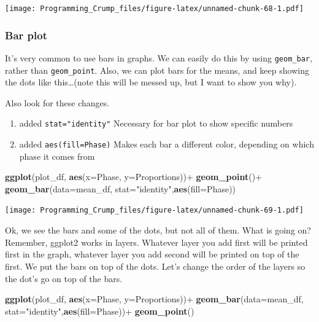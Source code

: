 \documentclass[]{book}
\newenvironment{Shaded}{\begin{snugshade}}{\end{snugshade}}
\newcommand{\KeywordTok}[1]{\textcolor[rgb]{0.13,0.29,0.53}{\textbf{{#1}}}}
\newcommand{\DataTypeTok}[1]{\textcolor[rgb]{0.13,0.29,0.53}{{#1}}}
\newcommand{\StringTok}[1]{\textcolor[rgb]{0.31,0.60,0.02}{{#1}}}
\newcommand{\NormalTok}[1]{{#1}}
\providecommand{\tightlist}{%
  \setlength{\itemsep}{0pt}\setlength{\parskip}{0pt}}
\theoremstyle{definition}
\theoremstyle{definition}
\theoremstyle{definition}
\theoremstyle{remark}
\begin{document}
\texttt{[image: Programming\_Crump\_files/figure-latex/unnamed-chunk-68-1.pdf]}

\subsubsection{Bar plot}\label{bar-plot}

It's very common to use bars in graphs. We can easily do this by using
\texttt{geom\_bar}, rather than \texttt{geom\_point}. Also, we can plot
bars for the means, and keep showing the dots like this\ldots{}(note
this will be messed up, but I want to show you why).

Also look for these changes.

\begin{enumerate}
\def\labelenumi{\arabic{enumi}.}
\tightlist
\item
  added \texttt{stat="identity"} Necessary for bar plot to show specific
  numbers
\item
  added \texttt{aes(fill=Phase)} Makes each bar a different color,
  depending on which phase it comes from
\end{enumerate}

\begin{Shaded}
\begin{Highlighting}[]
\KeywordTok{ggplot}\NormalTok{(plot_df, }\KeywordTok{aes}\NormalTok{(}\DataTypeTok{x=}\NormalTok{Phase, }\DataTypeTok{y=}\NormalTok{Proportions))+}\StringTok{ }
\StringTok{  }\KeywordTok{geom_point}\NormalTok{()+}
\StringTok{  }\KeywordTok{geom_bar}\NormalTok{(}\DataTypeTok{data=}\NormalTok{mean_df, }\DataTypeTok{stat=}\StringTok{"identity"}\NormalTok{,}\KeywordTok{aes}\NormalTok{(}\DataTypeTok{fill=}\NormalTok{Phase))}
\end{Highlighting}
\end{Shaded}

\texttt{[image: Programming\_Crump\_files/figure-latex/unnamed-chunk-69-1.pdf]}

Ok, we see the bars and some of the dots, but not all of them. What is
going on? Remember, ggplot2 works in layers. Whatever layer you add
first will be printed first in the graph, whatever layer you add second
will be printed on top of the first. We put the bars on top of the dots.
Let's change the order of the layers so the dot's go on top of the bars.

\begin{Shaded}
\begin{Highlighting}[]
\KeywordTok{ggplot}\NormalTok{(plot_df, }\KeywordTok{aes}\NormalTok{(}\DataTypeTok{x=}\NormalTok{Phase, }\DataTypeTok{y=}\NormalTok{Proportions))+}\StringTok{ }
\StringTok{  }\KeywordTok{geom_bar}\NormalTok{(}\DataTypeTok{data=}\NormalTok{mean_df, }\DataTypeTok{stat=}\StringTok{"identity"}\NormalTok{,}\KeywordTok{aes}\NormalTok{(}\DataTypeTok{fill=}\NormalTok{Phase))+}
\StringTok{  }\KeywordTok{geom_point}\NormalTok{()}
\end{Highlighting}
\end{Shaded}
\end{document}
